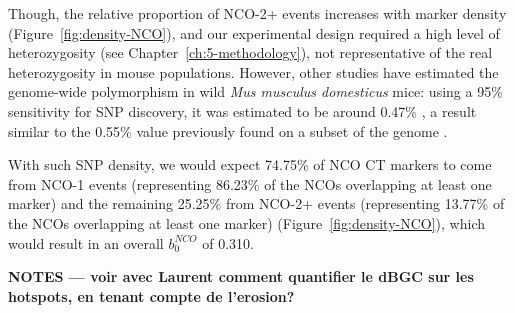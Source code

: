 Though, the relative proportion of NCO-2+ events increases with marker density (Figure~\ref{fig:density-NCO}), and our experimental design required a high level of heterozygosity (see Chapter~\ref{ch:5-methodology}), not representative of the real heterozygosity in mouse populations.
However, other studies have estimated the genome-wide polymorphism in wild \textit{Mus musculus domesticus} mice: using a 95\% sensitivity for SNP discovery, it was estimated to be around 0.47\% \citep{davies2015factors}, a result similar to the 0.55\% value previously found on a subset of the genome \citep{frazer2007sequencebased}.

With such SNP density, we would expect 74.75\% of NCO CT markers to come from NCO-1 events (representing 86.23\% of the NCOs overlapping at least one marker) and the remaining 25.25\% from NCO-2+ events (representing 13.77\% of the NCOs overlapping at least one marker) (Figure~\ref{fig:density-NCO}), which would result in an overall $b_0^{NCO}$ of 0.310.







\textbf{NOTES — voir avec Laurent comment quantifier le dBGC sur les hotspots, en tenant compte de l'erosion?}

